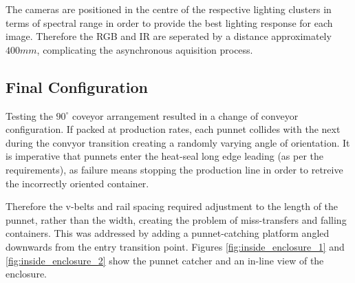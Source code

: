 \documentclass[fleqn,twoside]{article}
\begin{document}
The cameras are positioned in the centre of the respective lighting clusters in terms of spectral range in order to provide the best lighting response for each image. Therefore the RGB and IR are seperated by a distance approximately $400mm$, complicating the asynchronous aquisition process.







\subsection{Final Configuration}


Testing the $90^{\circ}$ coveyor arrangement resulted in a change of conveyor configuration. If packed at production rates, each punnet collides with the next during the convyor transition creating a randomly varying angle of orientation. It is imperative that punnets enter the heat-seal long edge leading (as per the requirements), as failure means stopping the production line in order to retreive the incorrectly oriented container.

Therefore the v-belts and rail spacing required adjustment to the length of the punnet, rather than the width, creating the problem of miss-transfers and falling containers. This was addressed by adding a punnet-catching platform angled downwards from the entry transition point. Figures \ref{fig:inside_enclosure_1} and \ref{fig:inside_enclosure_2} show the punnet catcher and an in-line view of the enclosure.
\end{document}
